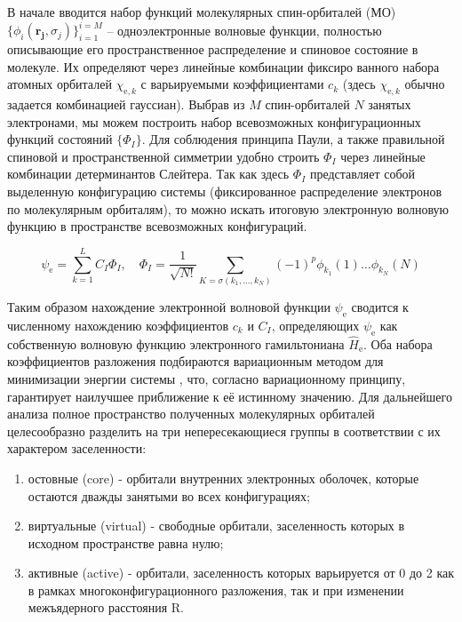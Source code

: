\documentclass[12pt]{extarticle}
\renewcommand{\vec}{\mathbf}
\begin{document}
    В начале вводится набор функций молекулярных спин-орбиталей (МО) $\{\phi_i (\vec{r_j}, \sigma_j)  \}_{i=1}^{i=M}$ -- одноэлектронные волновые функции, полностью описывающие его пространственное распределение и спиновое состояние в молекуле. Их определяют через линейные комбинации фиксиро
    ванного набора атомных орбиталей $\chi_{\text{e},k}$ с варьируемыми коэффициентами $c_k$ (здесь $\chi_{\text{e},k}$ обычно задается комбинацией гауссиан). Выбрав из $M$ спин-орбиталей $N$ занятых электронами, мы можем построить набор всевозможных конфигурационных функций состояний $\{\Phi_I \}$. Для соблюдения принципа Паули, а также правильной спиновой и пространственной симметрии удобно строить $\Phi_I$ через линейные комбинации детерминантов Слейтера. Так как здесь $\Phi_I$ представляет собой выделенную конфигурацию системы (фиксированное распределение электронов по молекулярным орбиталям), то можно искать итоговую электронную волновую функцию в пространстве всевозможных конфигураций.
    
    \begin{equation} \label{eq:slater}
    \psi_\text{e} = \sum_{k=1}^L C_I \Phi_I, \quad \Phi_I=\frac{1}{\sqrt{N!}} \sum_{K=\sigma\left(k_1, \ldots, k_N\right)}(-1)^p \phi_{k_1}(1) \ldots \phi_{k_N}(N)
	\end{equation}
      	
    Таким образом нахождение электронной волновой функции $\psi_\text{e}$ сводится к численному нахождению коэффициентов $c_k$ и $C_I$, определяющих $\psi_\text{e}$ как собственную волновую функцию электронного гамильтониана $\hat{H}_\text{e}$. Оба набора коэффициентов разложения подбираются вариационным методом для минимизации энергии системы \cite{87}, что, согласно вариационному принципу, гарантирует наилучшее приближение к её истинному значению. Для дальнейшего анализа полное пространство полученных молекулярных орбиталей целесообразно разделить на три непересекающиеся группы в соответствии с их характером заселенности:
    \begin{enumerate}
    	\item остовные (core) - орбитали внутренних электронных оболочек, которые остаются дважды занятыми во всех конфигурациях;
    	\item виртуальные (virtual) - свободные орбитали, заселенность которых в исходном пространстве равна нулю;
    	\item активные (active) - орбитали, заселенность которых варьируется от 0 до 2 как в рамках многоконфигурационного разложения, так и при изменении межъядерного расстояния R.
    \end{enumerate}
  
\end{document}
